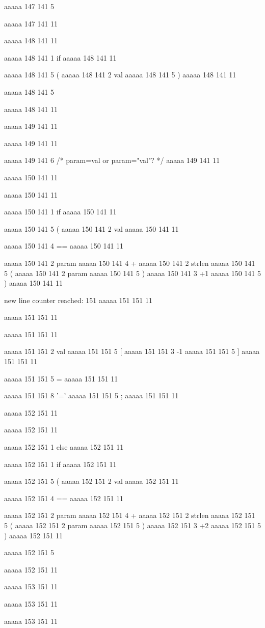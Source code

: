 aaaaa 147 141
5
{
aaaaa 147 141
11


aaaaa 148 141
11
	
aaaaa 148 141
1
if
aaaaa 148 141
11
 
aaaaa 148 141
5
(
aaaaa 148 141
2
val
aaaaa 148 141
5
)
aaaaa 148 141
11
 
aaaaa 148 141
5
{
aaaaa 148 141
11


aaaaa 149 141
11
	
aaaaa 149 141
11
	
aaaaa 149 141
6
/* param=val or param="val"? */
aaaaa 149 141
11


aaaaa 150 141
11
	
aaaaa 150 141
11
	
aaaaa 150 141
1
if
aaaaa 150 141
11
 
aaaaa 150 141
5
(
aaaaa 150 141
2
val
aaaaa 150 141
11
 
aaaaa 150 141
4
==
aaaaa 150 141
11
 
aaaaa 150 141
2
param
aaaaa 150 141
4
+
aaaaa 150 141
2
strlen
aaaaa 150 141
5
(
aaaaa 150 141
2
param
aaaaa 150 141
5
)
aaaaa 150 141
3
+1
aaaaa 150 141
5
)
aaaaa 150 141
11


new line counter reached: 151
aaaaa 151 151
11
	
aaaaa 151 151
11
	
aaaaa 151 151
11
	
aaaaa 151 151
2
val
aaaaa 151 151
5
[
aaaaa 151 151
3
-1
aaaaa 151 151
5
]
aaaaa 151 151
11
 
aaaaa 151 151
5
=
aaaaa 151 151
11
 
aaaaa 151 151
8
'='
aaaaa 151 151
5
;
aaaaa 151 151
11


aaaaa 152 151
11
	
aaaaa 152 151
11
	
aaaaa 152 151
1
else
aaaaa 152 151
11
 
aaaaa 152 151
1
if
aaaaa 152 151
11
 
aaaaa 152 151
5
(
aaaaa 152 151
2
val
aaaaa 152 151
11
 
aaaaa 152 151
4
==
aaaaa 152 151
11
 
aaaaa 152 151
2
param
aaaaa 152 151
4
+
aaaaa 152 151
2
strlen
aaaaa 152 151
5
(
aaaaa 152 151
2
param
aaaaa 152 151
5
)
aaaaa 152 151
3
+2
aaaaa 152 151
5
)
aaaaa 152 151
11
 
aaaaa 152 151
5
{
aaaaa 152 151
11


aaaaa 153 151
11
	
aaaaa 153 151
11
	
aaaaa 153 151
11
	
}}}
